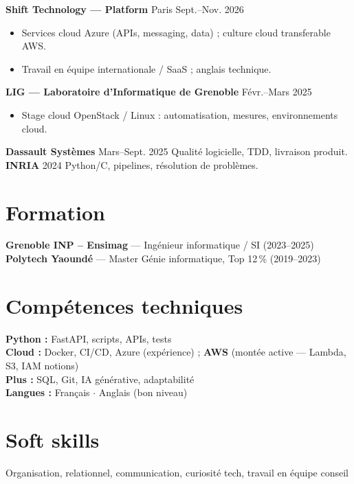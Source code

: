 \documentclass[10pt,a4paper]{article}
\begin{document}
\textbf{Shift Technology --- Platform} \hfill Paris \hfill Sept.--Nov. 2026
\begin{itemize}
  \item Services cloud Azure (APIs, messaging, data) ; culture cloud transferable AWS.
  \item Travail en \'equipe internationale / SaaS ; anglais technique.
\end{itemize}

\textbf{LIG --- Laboratoire d'Informatique de Grenoble} \hfill F\'evr.--Mars 2025
\begin{itemize}
  \item Stage cloud OpenStack / Linux : automatisation, mesures, environnements cloud.
\end{itemize}

\textbf{Dassault Syst\`emes} \hfill Mars--Sept. 2025 \quad Qualit\'e logicielle, TDD, livraison produit.\\
\textbf{INRIA} \hfill 2024 \quad Python/C, pipelines, r\'esolution de probl\`emes.

\section{Formation}
\textbf{Grenoble INP -- Ensimag} --- Ing\'enieur informatique / SI (2023--2025)\\
\textbf{Polytech Yaound\'e} --- Master G\'enie informatique, Top 12\,\% (2019--2023)

\section{Comp\'etences techniques}
\textbf{Python :} FastAPI, scripts, APIs, tests\\
\textbf{Cloud :} Docker, CI/CD, Azure (exp\'erience) ; \textbf{AWS} (mont\'ee active --- Lambda, S3, IAM notions)\\
\textbf{Plus :} SQL, Git, IA g\'en\'erative, adaptabilit\'e\\
\textbf{Langues :} Fran\c{c}ais $\cdot$ Anglais (bon niveau)

\section{Soft skills}
Organisation, relationnel, communication, curiosit\'e tech, travail en \'equipe conseil
\end{document}
